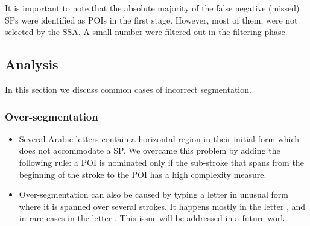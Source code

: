 \documentclass[10pt, conference, compsocconf]{IEEEtran}
\begin{document}
It is important to note that the absolute majority of the false negative (missed) SPs were identified as POIs in the first stage.
However, most of them, were not selected by the SSA.
A small number were filtered out in the filtering phase. 


\subsection{Analysis}
In this section we discuss common cases of incorrect segmentation.
\subsubsection{Over-segmentation}
\begin{itemize}
\item Several Arabic letters contain a horizontal region in their initial form which does not accommodate a SP. We overcame this problem by adding the following rule: a POI is nominated only if the sub-stroke that spans from the beginning of the stroke to the POI has a high complexity measure.
\item Over-segmentation can also be caused by typing a letter in unusual form where it is spanned over several strokes. 
It happens mostly in the letter ,  and in rare cases in the letter . This issue will be addressed in a future work.
\end{itemize}
\end{document}
